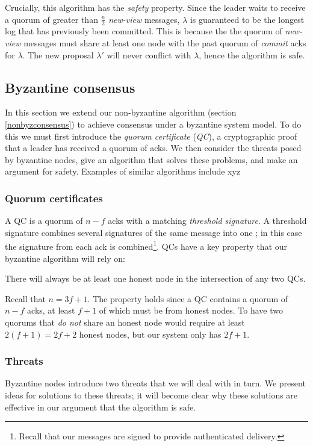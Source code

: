 Crucially, this algorithm has the \textit{safety} property. Since the leader waits to receive a quorum of greater than $\frac{n}{2}$ \textit{new-view} messages, $\lambda$ is guaranteed to be the longest log that has previously been committed. This is because the the quorum of \textit{new-view} messages must share at least one node with the past quorum of \textit{commit} acks for $\lambda$. The new proposal $\lambda'$ will never conflict with $\lambda$, hence the algorithm is safe.

\subsection{Byzantine consensus} \label{byzconsensus}
In this section we extend our non-byzantine algorithm (section \ref{nonbyzconsensus}) to achieve consensus under a byzantine system model. To do this we must first introduce the \textit{quorum certificate} (\textit{QC}), a cryptographic proof that a leader has received a quorum of acks. We then consider the threats posed by byzantine nodes, give an algorithm that solves these problems, and make an argument for safety. Examples of similar algorithms include xyz

\subsubsection{Quorum certificates}

A QC is a quorum of $n - f$ acks with a matching \textit{threshold signature}. A threshold signature combines several signatures of the same message into one \cite{shoupPracticalThresholdSignatures2000, cachinRandomOraclesConstantinople2005}; in this case the signature from each ack is combined\footnote{Recall that our messages are signed to provide authenticated delivery.}. QCs have a key property that our byzantine algorithm will rely on:

\begin{property} \label{qcproperty}
There will always be at least one honest node in the intersection of any two QCs.
\end{property}

Recall that $n = 3f + 1$. The property holds since a QC contains a quorum of $n - f$ acks, at least $f + 1$ of which must be from honest nodes. To have two quorums that \textit{do not} share an honest node would require at least $2(f + 1) = 2f + 2$ honest nodes, but our system only has $2f + 1$.

\subsubsection{Threats}
Byzantine nodes introduce two threats that we will deal with in turn. We present ideas for solutions to these threats; it will become clear why these solutions are effective in our argument that the algorithm is safe.

